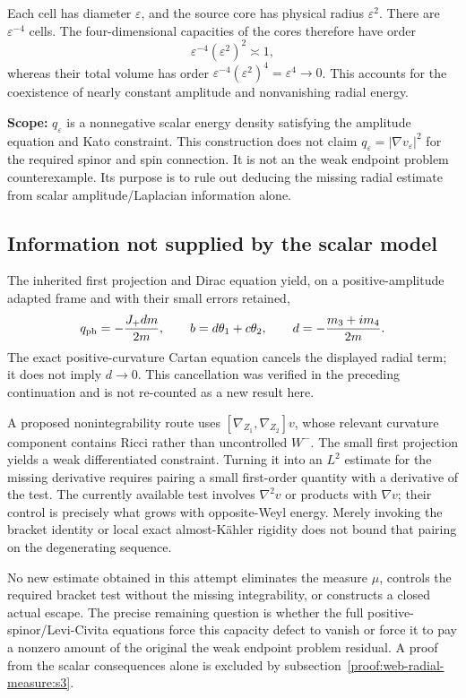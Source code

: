 Each cell has diameter \(\varepsilon\), and the source core has physical radius \(\varepsilon^2\). There are \(\varepsilon^{-4}\) cells. The four-dimensional capacities of the cores therefore have order \[
 \varepsilon^{-4}(\varepsilon^2)^2\asymp1,
\] whereas their total volume has order \(\varepsilon^{-4}(\varepsilon^2)^4=\varepsilon^4\to0\). This accounts for the coexistence of nearly constant amplitude and nonvanishing radial energy.

\textbf{Scope:} \(q_\varepsilon\) is a nonnegative scalar energy density satisfying the amplitude equation and Kato constraint. This construction does not claim \(q_\varepsilon=|\nabla v_\varepsilon|^2\) for the required spinor and spin connection. It is not an the weak endpoint problem counterexample. Its purpose is to rule out deducing the missing radial estimate from scalar amplitude/Laplacian information alone.

\hypertarget{proof:web-radial-measure:s4}{%
\subsection{Information not supplied by the scalar model}\label{proof:web-radial-measure:s4}}

The inherited first projection and Dirac equation yield, on a positive-amplitude adapted frame and with their small errors retained, \[
 q_{\rm ph}=-\frac{J_+dm}{2m},\qquad
 b=d\theta_1+c\theta_2,\qquad
 d=-\frac{m_3+im_4}{2m}.
\] The exact positive-curvature Cartan equation cancels the displayed radial term; it does not imply \(d\to0\). This cancellation was verified in the preceding continuation and is not re-counted as a new result here.

A proposed nonintegrability route uses \([\nabla_{Z_1},\nabla_{Z_2}]v\), whose relevant curvature component contains Ricci rather than uncontrolled \(W^-\). The small first projection yields a weak differentiated constraint. Turning it into an \(L^2\) estimate for the missing derivative requires pairing a small first-order quantity with a derivative of the test. The currently available test involves \(\nabla^2v\) or products with \(\nabla v\); their control is precisely what grows with opposite-Weyl energy. Merely invoking the bracket identity or local exact almost-Kähler rigidity does not bound that pairing on the degenerating sequence.

No new estimate obtained in this attempt eliminates the measure \(\mu\), controls the required bracket test without the missing integrability, or constructs a closed actual escape. The precise remaining question is whether the full positive-spinor/Levi-Civita equations force this capacity defect to vanish or force it to pay a nonzero amount of the original the weak endpoint problem residual. A proof from the scalar consequences alone is excluded by subsection~\ref{proof:web-radial-measure:s3}.

